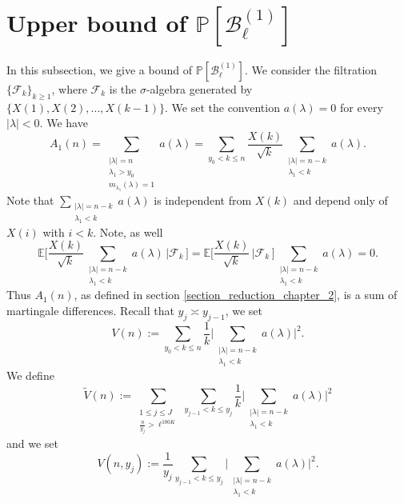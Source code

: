 \documentclass{article}
\begin{document}
\section{Upper bound of \texorpdfstring{$\mathbb{P}[\mathcal{B}^{(1)}_{\ell}]$}.}\label{section_B_1}
In this subsection, we give a bound of  $ \mathbb{P}[\mathcal{B}_{\ell}^{(1)}]$. We consider the filtration $\big\{ \mathcal{F}_k \big\}_{k\geqslant 1}$, where $\mathcal{F}_k$ is the $\sigma$-algebra generated by $\{X(1),X(2),...,X(k-1)\}$. We set the convention $a(\lambda)=0$ for every $|\lambda|<0$. We have 
$$
A_1(n)= \sum_{\substack{|\lambda|=n \\ \lambda_1 > y_0 \\ m_{\lambda_1}(\lambda)=1}} a(\lambda) = \sum_{ y_0 <k \leqslant n} \frac{X(k)}{\sqrt{k}} \sum_{\substack{|\lambda|=n-k \\ \lambda_1 <  k }} a(\lambda).
$$
Note that $\sum_{\substack{|\lambda|=n-k \\ \lambda_1 <  k }} a(\lambda)$ is independent from $X(k)$ and depend only of $X(i)$ with $i<k$. Note, as well 
$$
\mathbb{E}\bigg[ \frac{X(k)}{\sqrt{k}} \sum_{\substack{|\lambda|=n-k \\ \lambda_1 <  k }} a(\lambda)\, \bigg| \mathcal{F}_{k} \,\bigg]=\mathbb{E}\bigg[ \frac{X(k)}{\sqrt{k}} \, \bigg| \mathcal{F}_{k} \,\bigg] \sum_{\substack{|\lambda|=n-k \\ \lambda_1 <  k }} a(\lambda) =0.
$$
Thus $A_1(n)$, as defined in section \ref{section_reduction_chapter_2}, is a sum of martingale differences. Recall that $y_j\asymp y_{j-1}$, we set
\begin{equation}\label{V_n}
    V(n) := \sum_{ y_0 <k \leqslant n} \frac{1}{k}\bigg| \sum_{\substack{|\lambda|=n-k \\ \lambda_1 <  k }} a(\lambda) \bigg|^2.
\end{equation}
We define
\begin{equation}\label{V_tilde_n}
    \widetilde{V}(n):= \sum_{\substack{ 1 \leqslant j\leqslant J \\ \frac{n}{y_{j}} >\ell^{100K}}}\sum_{ y_{j-1} <k \leqslant y_j}  \frac{1}{k}\bigg| \sum_{\substack{|\lambda|=n-k \\ \lambda_1 <  k }} a(\lambda) \bigg|^2
\end{equation}
and we set
\begin{equation}\label{V_n_y}
    V(n,y_{j}):= \frac{1}{y_{j}}\sum_{ y_{j-1} <k \leqslant y_j} \bigg| \sum_{\substack{|\lambda|=n-k \\ \lambda_1 <  k }} a(\lambda) \bigg|^2.
\end{equation}
\end{document}
